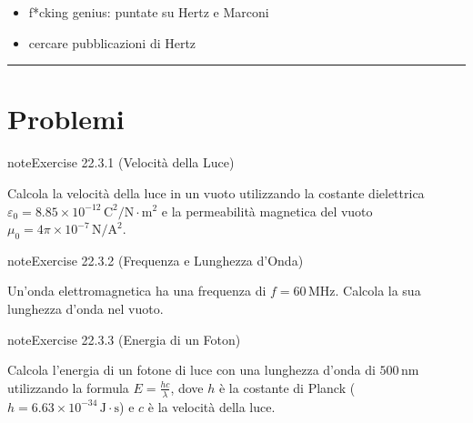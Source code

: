 \documentclass[letterpaper,10pt,italian]{jupyterBook}
\begin{document}
\sphinxAtStartPar
{}  

\sphinxAtStartPar
{}
\begin{itemize}
\item {} 
\sphinxAtStartPar
f*cking genius: puntate su Hertz e Marconi

\item {} 
\sphinxAtStartPar
cercare pubblicazioni di Hertz

\end{itemize}


\bigskip\hrule\bigskip


\sphinxstepscope


\section{Problemi}
\label{\detokenize{ch/electromagnetism/em-waves-problems:problemi}}\label{\detokenize{ch/electromagnetism/em-waves-problems:physics-hs-electromagnetism-em-waves-problems}}\label{\detokenize{ch/electromagnetism/em-waves-problems::doc}} \label{exercise:ch/electromagnetism/em-waves-problems-exercise-0}

\begin{sphinxadmonition}{note}{Exercise 22.3.1 (Velocità della Luce)}



\sphinxAtStartPar
Calcola la velocità della luce in un vuoto utilizzando la costante dielettrica \(\varepsilon_0 = 8.85 \times 10^{-12} \, \text{C}^2/\text{N} \cdot \text{m}^2\) e la permeabilità magnetica del vuoto \(\mu_0 = 4\pi \times 10^{-7} \, \text{N}/\text{A}^2\).
\end{sphinxadmonition}
 \label{exercise:ch/electromagnetism/em-waves-problems-exercise-1}

\begin{sphinxadmonition}{note}{Exercise 22.3.2 (Frequenza e Lunghezza d’Onda)}



\sphinxAtStartPar
Un’onda elettromagnetica ha una frequenza di \(f = 60 \, \text{MHz}\). Calcola la sua lunghezza d’onda nel vuoto.
\end{sphinxadmonition}
 \label{exercise:ch/electromagnetism/em-waves-problems-exercise-2}

\begin{sphinxadmonition}{note}{Exercise 22.3.3 (Energia di un Foton)}



\sphinxAtStartPar
Calcola l’energia di un fotone di luce con una lunghezza d’onda di \(500 \, \text{nm}\) utilizzando la formula \(E = \frac{h c}{\lambda}\), dove \(h\) è la costante di Planck (\(h = 6.63 \times 10^{-34} \, \text{J} \cdot \text{s}\)) e \(c\) è la velocità della luce.
\end{sphinxadmonition}
 \label{exercise:ch/electromagnetism/em-waves-problems-exercise-3}
\end{document}
